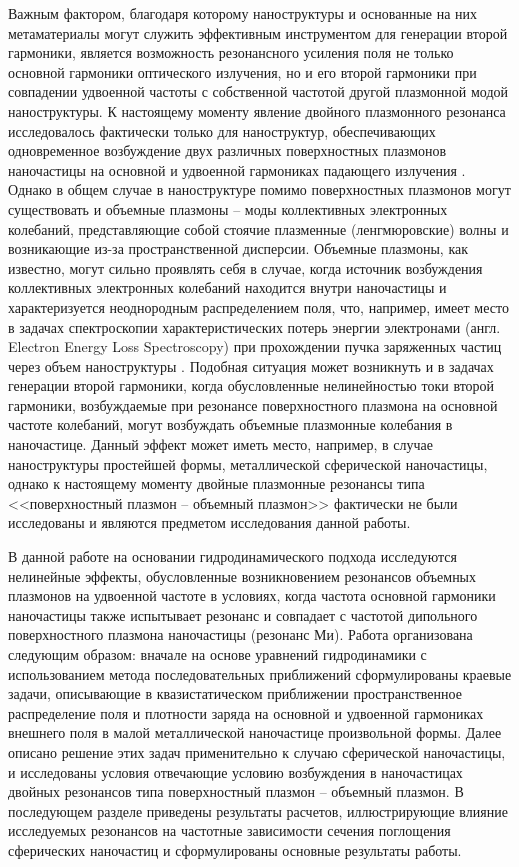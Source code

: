\documentclass[12pt, a4paper]{article}
\begin{document}
Важным фактором, благодаря которому наноструктуры и основанные на них метаматериалы могут служить эффективным инструментом для генерации второй гармоники, является возможность резонансного усиления поля не только основной гармоники оптического излучения, но и его второй гармоники при совпадении удвоенной частоты с собственной частотой другой плазмонной модой наноструктуры. 
К настоящему моменту явление двойного плазмонного резонанса исследовалось фактически только для наноструктур, обеспечивающих одновременное возбуждение двух различных поверхностных плазмонов наночастицы на основной и удвоенной гармониках падающего излучения \cite{Ai2021,Thyagarajan2012}.
Однако в общем случае в наноструктуре помимо поверхностных плазмонов могут существовать и объемные плазмоны \cite{Elibol2022,Gildenburg2016,Ruppin1975,Gildenburg1965} -- моды коллективных электронных колебаний, представляющие собой стоячие плазменные (ленгмюровские) волны и возникающие из-за пространственной дисперсии. 
 Объемные плазмоны, как известно, могут сильно проявлять себя в случае, когда источник возбуждения коллективных электронных колебаний находится внутри наночастицы и характеризуется неоднородным распределением поля, что, например, имеет место в задачах спектроскопии характеристических потерь энергии электронами (англ. Electron Energy Loss Spectroscopy) при прохождении  пучка заряженных частиц через объем наноструктуры
\cite{Gildenburg2016, Kryshtal2025}. 
Подобная ситуация может возникнуть и в задачах генерации второй гармоники, когда обусловленные нелинейностью токи второй гармоники, возбуждаемые при резонансе поверхностного плазмона на основной частоте колебаний, могут возбуждать объемные плазмонные колебания в наночастице. Данный эффект может иметь место, например, в случае наноструктуры простейшей формы, металлической сферической наночастицы, однако к настоящему моменту двойные плазмонные резонансы типа <<поверхностный плазмон -- объемный плазмон>> фактически не были исследованы и являются предметом исследования данной работы.

В данной работе на основании гидродинамического подхода \cite{Haas2011, Boardman1982, Manfredi2021} исследуются нелинейные эффекты, обусловленные возникновением резонансов объемных плазмонов на удвоенной частоте в условиях, когда частота основной гармоники наночастицы также испытывает резонанс и совпадает с частотой дипольного поверхностного плазмона наночастицы (резонанс Ми). Работа организована следующим образом: вначале на основе уравнений гидродинамики с использованием метода последовательных приближений сформулированы краевые задачи, описывающие в квазистатическом приближении пространственное распределение поля и плотности заряда на основной и удвоенной гармониках внешнего поля в малой металлической наночастице произвольной формы. Далее описано решение этих задач применительно к случаю сферической наночастицы, и исследованы условия отвечающие условию возбуждения в наночастицах двойных резонансов типа поверхностный плазмон – объемный плазмон. В последующем разделе приведены результаты расчетов, иллюстрирующие влияние исследуемых резонансов на частотные зависимости сечения поглощения сферических наночастиц и сформулированы основные результаты работы.
\end{document}
